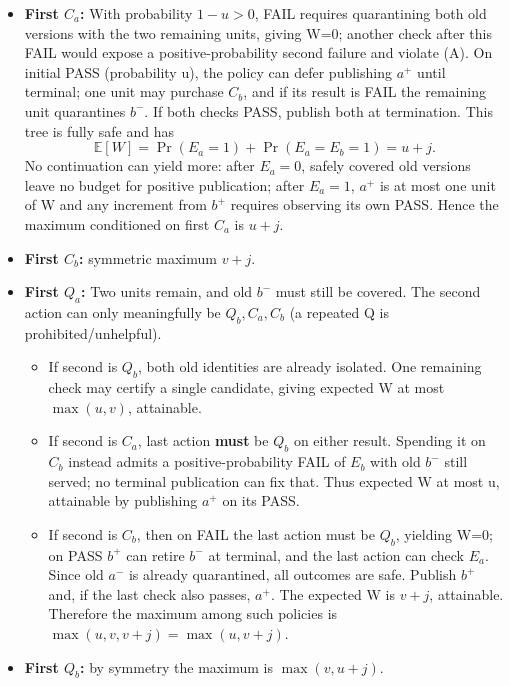 \documentclass[
  10pt,
  american,
  a4paper,
]{article}
\providecommand{\tightlist}{%
  \setlength{\itemsep}{0pt}\setlength{\parskip}{0pt}}
\begin{document}
\begin{itemize}
\tightlist
\item
  \textbf{First \(C_a\):} With probability \(1-u>0\), FAIL requires
  quarantining both old versions with the two remaining units, giving
  W=0; another check after this FAIL would expose a positive-probability
  second failure and violate (A). On initial PASS (probability u), the
  policy can defer publishing \(a^+\) until terminal; one unit may
  purchase \(C_b\), and if its result is FAIL the remaining unit
  quarantines \(b^-\). If both checks PASS, publish both at termination.
  This tree is fully safe and has \[
  \mathbb E[W]=\Pr(E_a=1)+\Pr(E_a=E_b=1)=u+j.
  \] No continuation can yield more: after \(E_a=0\), safely covered old
  versions leave no budget for positive publication; after \(E_a=1\),
  \(a^+\) is at most one unit of W and any increment from \(b^+\)
  requires observing its own PASS. Hence the maximum conditioned on
  first \(C_a\) is \(u+j\).
\item
  \textbf{First \(C_b\):} symmetric maximum \(v+j\).
\item
  \textbf{First \(Q_a\):} Two units remain, and old \(b^-\) must still
  be covered. The second action can only meaningfully be \(Q_b,C_a,C_b\)
  (a repeated Q is prohibited/unhelpful).

  \begin{itemize}
  \tightlist
  \item
    If second is \(Q_b\), both old identities are already isolated. One
    remaining check may certify a single candidate, giving expected W at
    most \(\max(u,v)\), attainable.
  \item
    If second is \(C_a\), last action \textbf{must} be \(Q_b\) on either
    result. Spending it on \(C_b\) instead admits a positive-probability
    FAIL of \(E_b\) with old \(b^-\) still served; no terminal
    publication can fix that. Thus expected W at most u, attainable by
    publishing \(a^+\) on its PASS.
  \item
    If second is \(C_b\), then on FAIL the last action must be \(Q_b\),
    yielding W=0; on PASS \(b^+\) can retire \(b^-\) at terminal, and
    the last action can check \(E_a\). Since old \(a^-\) is already
    quarantined, all outcomes are safe. Publish \(b^+\) and, if the last
    check also passes, \(a^+\). The expected W is \(v+j\), attainable.
    Therefore the maximum among such policies is
    \(\max(u,v,v+j)=\max(u,v+j)\).
  \end{itemize}
\item
  \textbf{First \(Q_b\):} by symmetry the maximum is \(\max(v,u+j)\).
\end{itemize}
\end{document}
